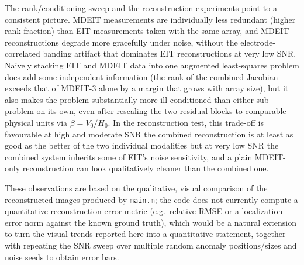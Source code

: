 \documentclass[11pt]{article}
\begin{document}
The rank/conditioning sweep and the reconstruction experiments point to a consistent picture. MDEIT measurements are individually less redundant (higher rank fraction) than EIT measurements taken with the same array, and MDEIT reconstructions degrade more gracefully under noise, without the electrode-correlated banding artifact that dominates EIT reconstructions at very low SNR. Naively stacking EIT and MDEIT data into one augmented least-squares problem does add some independent information (the rank of the combined Jacobian exceeds that of MDEIT-3 alone by a margin that grows with array size), but it also makes the problem substantially more ill-conditioned than either sub-problem on its own, even after rescaling the two residual blocks to comparable physical units via $\beta = V_0/H_0$. In the reconstruction test, this trade-off is favourable at high and moderate SNR \textemdash{} the combined reconstruction is at least as good as the better of the two individual modalities \textemdash{} but at very low SNR the combined system inherits some of EIT's noise sensitivity, and a plain MDEIT-only reconstruction can look qualitatively cleaner than the combined one.

These observations are based on the qualitative, visual comparison of the reconstructed images produced by \texttt{main.m}; the code does not currently compute a quantitative reconstruction-error metric (e.g.\ relative RMSE or a localization-error norm against the known ground truth), which would be a natural extension to turn the visual trends reported here into a quantitative statement, together with repeating the SNR sweep over multiple random anomaly positions/sizes and noise seeds to obtain error bars.
\end{document}
